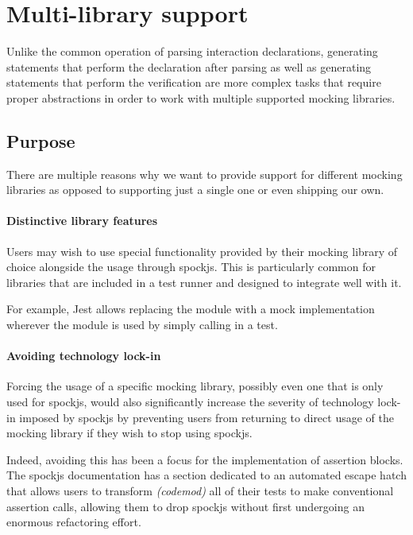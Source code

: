 \section{Multi-library support}
Unlike the common operation of parsing interaction declarations,
generating statements that perform the declaration after parsing
as well as generating statements that perform the verification
are more complex tasks that require proper abstractions in order
to work with multiple supported mocking libraries.

\subsection{Purpose}
There are multiple reasons why we want to provide support
for different mocking libraries as opposed to
supporting just a single one or even shipping our own.

\paragraph{Distinctive library features}
Users may wish to use special functionality
provided by their mocking library of choice
alongside the usage through spockjs.
This is particularly common for libraries
that are included in a test runner and
designed to integrate well with it.

For example, Jest \autocite{JestGithub}
allows replacing the module 
with a mock implementation 
wherever the module is used by simply
calling  in a test.
\autocite{JestMockFunctions}

\paragraph{Avoiding technology lock-in}
Forcing the usage of a specific mocking library,
possibly even one that is only used for spockjs,
would also significantly increase the severity of
technology lock-in imposed by spockjs
by preventing users from returning to
direct usage of the mocking library
if they wish to stop using spockjs.

Indeed, avoiding this has been a focus
for the implementation of assertion blocks.
The spockjs documentation has a section
dedicated to an automated escape hatch
that allows users to transform \textit{(codemod)}
all of their tests to make conventional assertion calls,
allowing them to drop spockjs without first
undergoing an enormous refactoring effort.
\autocite{SpockjsGithub}

